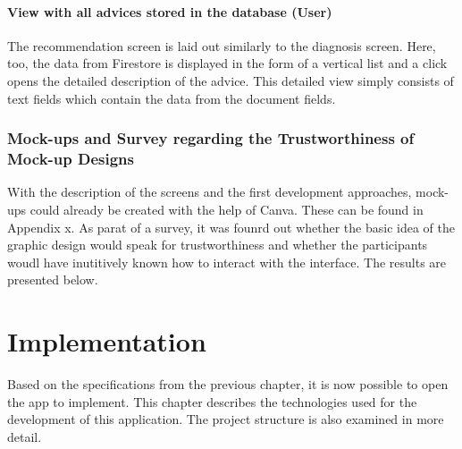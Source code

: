 \subsubsection{\textbf{View with all advices stored in the database (User) }}
The recommendation screen is laid out similarly to the diagnosis screen. Here, too, the data from Firestore is displayed in the form of a vertical list and a click opens the detailed description of the advice. This detailed view simply consists of text fields which contain the data from the document fields.
\subsection{Mock-ups and Survey regarding the Trustworthiness of Mock-up Designs}
With the description of the screens and the first development approaches, mock-ups could already be created with the help of Canva. These can be found in Appendix x. As parat of a survey, it was founrd out whether the basic idea of the graphic design would speak for trustworthiness and whether the participants woudl have inutitively known how to interact with the interface. The results are presented below.



\chapter{Implementation}
Based on the specifications from the previous chapter, it is now possible to open the app to implement. This chapter describes the technologies used for the development of this application. The project structure is also examined in more detail.
